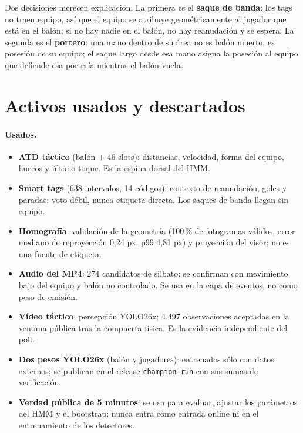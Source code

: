 \documentclass[10pt,a4paper]{article}
\begin{document}
Dos decisiones merecen explicación. La primera es el \textbf{saque de banda}: los tags no traen
equipo, así que el equipo se atribuye geométricamente al jugador que está en el balón; si no hay
nadie en el balón, no hay reanudación y se espera. La segunda es el \textbf{portero}: una mano
dentro de su área no es balón muerto, es posesión de su equipo; el saque largo desde esa mano
asigna la posesión al equipo que defiende esa portería mientras el balón vuela.

\section{Activos usados y descartados}

\paragraph{Usados.}
\begin{itemize}
\item \textbf{ATD táctico} (balón + 46 slots): distancias, velocidad, forma del equipo, huecos y
último toque. Es la espina dorsal del HMM.
\item \textbf{Smart tags} (638 intervalos, 14 códigos): contexto de reanudación, goles y paradas;
voto débil, nunca etiqueta directa. Los saques de banda llegan sin equipo.
\item \textbf{Homografía}: validación de la geometría (100\,\% de fotogramas válidos, error mediano
de reproyección 0,24 px, p99 4,81 px) y proyección del visor; no es una fuente de etiqueta.
\item \textbf{Audio del MP4}: 274 candidatos de silbato; se confirman con movimiento bajo del
equipo y balón no controlado. Se usa en la capa de eventos, no como peso de emisión.
\item \textbf{Vídeo táctico}: percepción YOLO26x; 4.497 observaciones aceptadas en la ventana
pública tras la compuerta física. Es la evidencia independiente del poll.
\item \textbf{Dos pesos YOLO26x} (balón y jugadores): entrenados sólo con datos externos; se
publican en el release \texttt{champion-run} con sus sumas de verificación.
\item \textbf{Verdad pública de 5 minutos}: se usa para evaluar, ajustar los parámetros del HMM y
el bootstrap; nunca entra como entrada online ni en el entrenamiento de los detectores.
\end{itemize}
\end{document}

